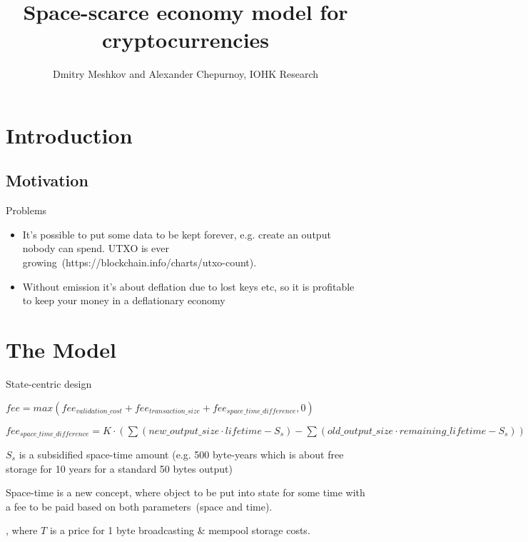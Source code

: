 \documentclass[]{article}   %
\begin{document}
\title{Space-scarce economy model for cryptocurrencies}
\author{Dmitry Meshkov and Alexander Chepurnoy, IOHK Research}
\maketitle

\section{Introduction}

\subsection{Motivation}

Problems
\begin{itemize}
  \item It's possible to put some data to be kept forever, e.g. create an output nobody can spend. UTXO is ever growing~(https://blockchain.info/charts/utxo-count).
  \item Without emission it's about deflation due to lost keys etc, so it is profitable to keep your money in a deflationary economy
\end{itemize}


\section{The Model}

State-centric design

$fee = max(fee_{validation\_cost} + fee_{transaction\_size} + fee_{space\_time\_difference}, 0)$

$fee_{space\_time\_difference} = K \cdot (\sum{(new\_output\_size \cdot lifetime - S_s)} - \sum{(old\_output\_size \cdot remaining\_lifetime - S_s)})$

$S_s$ is a subsidified space-time amount (e.g. 500 byte-years which is about free storage for 10 years for a standard 50 bytes output)

Space-time is a new concept, where object to be put into state for some time with a fee to be paid based on both parameters~(space and time). 




, where $T$ is a price for 1 byte broadcasting \& mempool storage costs.
\end{document}
